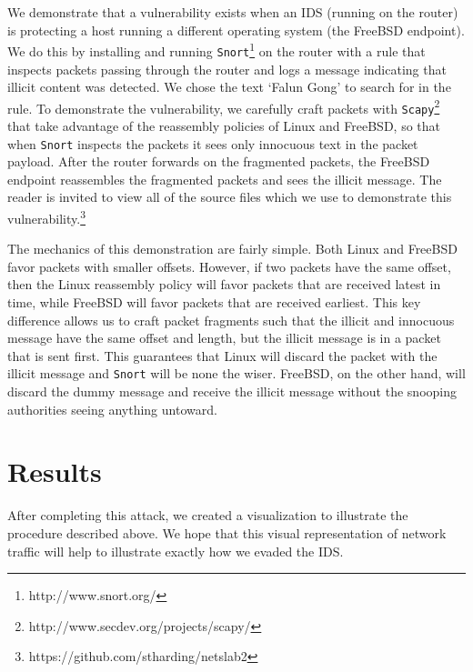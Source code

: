 \documentclass[]{article}
\begin{document}
We demonstrate that a vulnerability exists when an IDS (running on the router) is protecting a host running a different operating system (the FreeBSD endpoint). We do this by installing and running \texttt{Snort}\footnote{http://www.snort.org/} on the router with a rule that inspects packets passing through the router and logs a message indicating that illicit content was detected. We chose the text `Falun Gong' to search for in the rule. To demonstrate the vulnerability, we carefully craft packets with \texttt{Scapy}\footnote{http://www.secdev.org/projects/scapy/} that take advantage of the reassembly policies of Linux and FreeBSD, so that when \texttt{Snort} inspects the packets it sees only innocuous text in the packet payload. After the router forwards on the fragmented packets, the FreeBSD endpoint reassembles the fragmented packets and sees the illicit message. The reader is invited to view all of the source files which we use to demonstrate this 
vulnerability.\footnote{https://github.com/stharding/netslab2}

The mechanics of this demonstration are fairly simple. Both Linux and FreeBSD favor packets with smaller offsets. However, if two packets have the same offset, then the Linux reassembly policy will favor packets that are received latest in time, while FreeBSD will favor packets that are received earliest. This key difference allows us to craft packet fragments such that the illicit and innocuous message have the same offset and length, but the illicit message is in a packet that is sent first. This guarantees that Linux will discard the packet with the illicit message and \texttt{Snort} will be none the wiser. FreeBSD, on the other hand, will discard the dummy message and receive the illicit message without the snooping authorities seeing anything untoward.

\section{Results}

After completing this attack, we created a visualization to illustrate the procedure described above. We hope that this visual representation of network traffic will help to illustrate exactly how we evaded the IDS.
\end{document}
